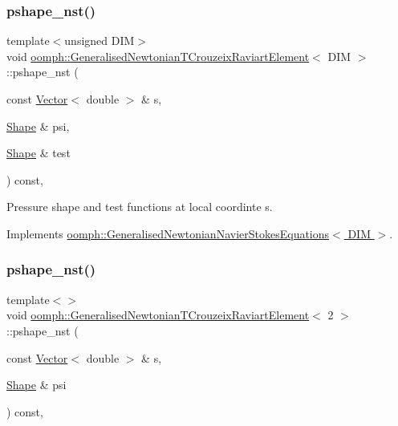 \subsubsection{\texorpdfstring{pshape\+\_\+nst()}{pshape\_nst()}\hspace{0.1cm}{\footnotesize\ttfamily [2/6]}}
{\footnotesize\ttfamily template$<$unsigned D\+IM$>$ \\
void \hyperlink{classoomph_1_1GeneralisedNewtonianTCrouzeixRaviartElement}{oomph\+::\+Generalised\+Newtonian\+T\+Crouzeix\+Raviart\+Element}$<$ D\+IM $>$\+::pshape\+\_\+nst (\begin{DoxyParamCaption}\item[{const \hyperlink{classoomph_1_1Vector}{Vector}$<$ double $>$ \&}]{s,  }\item[{\hyperlink{classoomph_1_1Shape}{Shape} \&}]{psi,  }\item[{\hyperlink{classoomph_1_1Shape}{Shape} \&}]{test }\end{DoxyParamCaption}) const\hspace{0.3cm}{\ttfamily [inline]}, {\ttfamily [virtual]}}



Pressure shape and test functions at local coordinte s. 



Implements \hyperlink{classoomph_1_1GeneralisedNewtonianNavierStokesEquations_afb01a54f377b1bebe141ed8e11ced138}{oomph\+::\+Generalised\+Newtonian\+Navier\+Stokes\+Equations$<$ D\+I\+M $>$}.

\mbox{\label{classoomph_1_1GeneralisedNewtonianTCrouzeixRaviartElement_a5de86cc3b673bfe4a8a6ba03fc3e1825}} 
\subsubsection{\texorpdfstring{pshape\+\_\+nst()}{pshape\_nst()}\hspace{0.1cm}{\footnotesize\ttfamily [3/6]}}
{\footnotesize\ttfamily template$<$$>$ \\
void \hyperlink{classoomph_1_1GeneralisedNewtonianTCrouzeixRaviartElement}{oomph\+::\+Generalised\+Newtonian\+T\+Crouzeix\+Raviart\+Element}$<$ 2 $>$\+::pshape\+\_\+nst (\begin{DoxyParamCaption}\item[{const \hyperlink{classoomph_1_1Vector}{Vector}$<$ double $>$ \&}]{s,  }\item[{\hyperlink{classoomph_1_1Shape}{Shape} \&}]{psi }\end{DoxyParamCaption}) const\hspace{0.3cm}{\ttfamily [inline]}, {\ttfamily [virtual]}}

